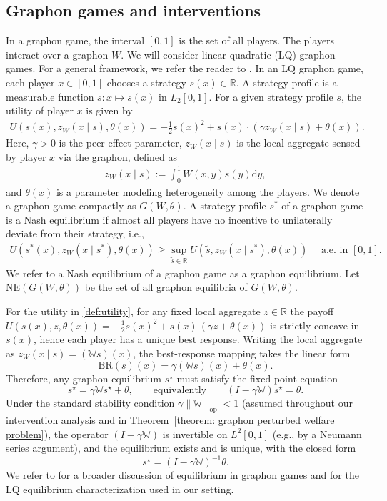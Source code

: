 \documentclass[11pt]{article}
\newcommand{\bbR}{\mathbb{R}}
\newcommand{\<}{\langle}
\renewcommand{\>}{\rangle}
\theoremstyle{plain}
\theoremstyle{definition}
\theoremstyle{remark}
\begin{document}
\subsection{Graphon games and interventions}


In a graphon game, the interval $[0,1]$ is the set of all players. The players interact over a graphon $W$. We will consider linear-quadratic (LQ) graphon games. For a general framework, we refer the reader to \cite{Parise_Ozdaglar_Econometrica}. In an LQ graphon game, each player $x \in[0,1]$ chooses a strategy $s(x) \in \bbR$. A strategy profile is a measurable function $s: x \mapsto s(x)$ in $L_{2}[0,1]$. For a given strategy profile $s$, the utility of player $x$ is given by 
\begin{align}\label{def:utility}
    U\left(s(x), z_{W}(x \mid s), \theta(x)\right) = -\frac{1}{2} s(x)^2 + s(x) \cdot \left(\gamma z_W(x \mid s) + \theta(x)\right). 
\end{align}
Here, $\gamma > 0$ is the peer-effect parameter, $z_{W}(x \mid s)$ is the local aggregate sensed by player $x$ via the graphon, defined as
\begin{align}
    z_{W}(x \mid s):=\int_{0}^{1} W(x, y) s(y) \mathrm{d} y, 
\end{align}
and $\theta(x)$ is a parameter modeling heterogeneity among the players. 
We denote a graphon game compactly as $G(W, \theta)$. 
A strategy profile $s^{*}$ of a graphon game is a Nash equilibrium if almost all players have no incentive to unilaterally deviate from their strategy, i.e.,
\begin{align}
    U\left(s^{*}(x), z_{W}\left(x \mid s^{*}\right), \theta(x)\right) \geq \sup _{\tilde{s} \in \bbR} U\left(\tilde{s}, z_{W}\left(x \mid s^{*}\right), \theta(x)\right) \quad \text { a.e. in }[0,1]. 
\end{align}
We  refer to a Nash equilibrium of a graphon game as a graphon equilibrium. Let $\mathrm{NE}(G(W, \theta))$ be the set of all graphon equilibria of $G(W, \theta)$. 

{
For the utility in \eqref{def:utility}, for any fixed local aggregate $z\in\mathbb{R}$ the payoff
$U(s(x),z,\theta(x))=-\frac12 s(x)^2 + s(x)\,(\gamma z+\theta(x))$ is strictly concave in $s(x)$, hence each player
has a unique best response. Writing the local aggregate as $z_W(x\mid s)=(\mathbb{W}s)(x)$, the best-response
mapping takes the linear form
\[
\mathrm{BR}(s)(x)=\gamma(\mathbb{W}s)(x)+\theta(x).
\]
Therefore, any graphon equilibrium $s^\star$ must satisfy the fixed-point equation
\[
s^\star=\gamma\mathbb{W}s^\star+\theta,
\qquad\text{equivalently}\qquad
(I-\gamma\mathbb{W})s^\star=\theta.
\]
Under the standard stability condition $\gamma\|\mathbb{W}\|_{\mathrm{op}}<1$ (assumed throughout our intervention
analysis and in Theorem~\ref{theorem: graphon perturbed welfare problem}), the operator $(I-\gamma\mathbb{W})$ is invertible on $L^2[0,1]$
(e.g., by a Neumann series argument), and the equilibrium exists and is unique, with the closed form
\[
s^\star=(I-\gamma\mathbb{W})^{-1}\theta.
\]
We refer to \cite{Parise_Ozdaglar_Econometrica} for a broader discussion of equilibrium in graphon games and for the
LQ equilibrium characterization used in our setting.
}
\end{document}
